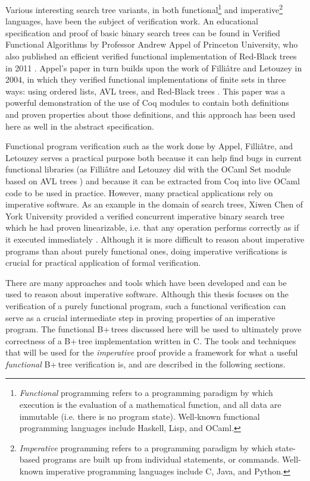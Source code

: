 \documentclass[12pt]{article}
\begin{document}
Various interesting search tree variants, in both functional\footnote{\textit{Functional} programming refers to a programming paradigm by which execution is the evaluation of a mathematical function, and all data are immutable (i.e. there is no program state). Well-known functional programming languages include Haskell, Lisp, and OCaml.} and imperative\footnote{\textit{Imperative} programming refers to a programming paradigm by which state-based programs are built up from individual statements, or commands. Well-known imperative programming languages include C, Java, and Python.} languages, have been the subject of verification work. An educational specification and proof of basic binary search trees can be found in Verified Functional Algorithms \cite{appel} by Professor Andrew Appel of Princeton University, who also published an efficient verified functional implementation of Red-Black trees in 2011 \cite{appel_2011}. Appel’s paper in turn builds upon the work of Filliâtre and Letouzey in 2004, in which they verified functional implementations of finite sets in three ways: using ordered lists, AVL trees, and Red-Black trees \cite{filliatre:hal-00150913}. This paper was a powerful demonstration of the use of Coq modules to contain both definitions and proven properties about those definitions, and this approach has been used here as well in the abstract specification.

Functional program verification such as the work done by Appel, Filliâtre, and Letouzey serves a practical purpose both because it can help find bugs in current functional libraries (as Filliâtre and Letouzey did with the OCaml Set module based on AVL trees \cite{filliatre:hal-00150913}) and because it can be extracted from Coq into live OCaml code to be used in practice. However, many practical applications rely on imperative software. As an example in the domain of search trees, Xiwen Chen of York University provided a verified concurrent imperative binary search tree which he had proven linearizable, i.e. that any operation performs correctly as if it executed immediately \cite{chen_ruppert_breugel_2013}. Although it is more difficult to reason about imperative programs than about purely functional ones, doing imperative verifications is crucial for practical application of formal verification.

There are many approaches and tools which have been developed and can be used to reason about imperative software. Although this thesis focuses on the verification of a purely functional program, such a functional verification can serve as a crucial intermediate step in proving properties of an imperative program. The functional B+\,trees discussed here will be used to ultimately prove correctness of a B+\,tree implementation written in C. The tools and techniques that will be used for the \textit{imperative} proof provide a framework for what a useful \textit{functional} B+\,tree verification is, and are described in the following sections.
\end{document}
